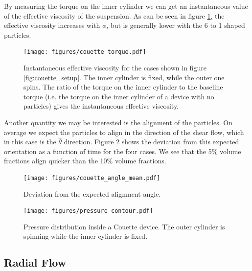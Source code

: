 \documentclass[preprint, 10pt]{elsarticle}
\begin{document}
By measuring the torque on the inner cylinder we can get an instantaneous value of the effective viscosity of the suspension. As can be seen in figure \ref{fig:torque}, the effective viscosity increases with $\phi$, but is generally lower with the 6 to 1 shaped particles.
\begin{figure}[!h]
\begin{center}
\texttt{[image: figures/couette\_torque.pdf]}\\
\end{center}
\caption{Instantaneous effective viscosity for the cases shown in figure \ref{fig:couette_setup}. The inner cylinder is fixed, while the outer one spins. The ratio of the torque on the inner cylinder to the baseline torque (i.e. the torque on the inner cylinder of a device with no particles) gives the instantaneous effective viscosity.}\label{fig:torque}
\end{figure} 

Another quantity we may be interested is the alignment of the particles. On average we expect the particles to align in the direction of the shear flow, which in this case is the $\hat{\theta}$ direction. Figure \ref{fig:angles} shows the deviation from this expected orientation as a function of time for the four cases. We see that the 5\% volume fractions align quicker than the 10\% volume fractions. 

\begin{figure}[!h]
\begin{center}
\texttt{[image: figures/couette\_angle\_mean.pdf]}\\
\end{center}
\caption{Deviation from the expected alignment angle. }\label{fig:angles}
\end{figure} 

\begin{figure}[!h]
\begin{center}
\texttt{[image: figures/pressure\_contour.pdf]}
\end{center}
\caption{Pressure distribution inside a Couette device. The outer cylinder is spinning while the inner cylinder is fixed. }\label{fig:dissipation}
\end{figure}


\subsection{Radial Flow}
\end{document}
